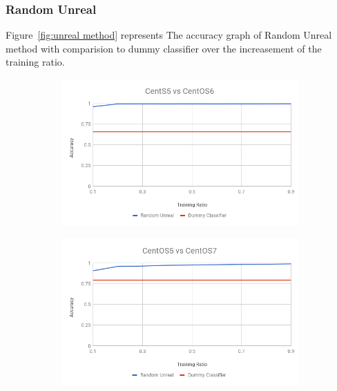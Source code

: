 \documentclass[10pt, conference, compsocconf]{IEEEtran}
\begin{document}
\subsubsection{Random Unreal}
Figure~\ref{fig:unreal method} represents
The accuracy graph of Random Unreal method with comparision to dummy
classifier over the increasement of the training ratio.
\begin{figure}[h!]
        \centering
        \begin{subfigure}[b]{0.8\linewidth}
                \includegraphics[width=\columnwidth]{figures/ALS/unreal-ALS-5vs6-PFS}
        \end{subfigure}
        \begin{subfigure}[b]{0.8\linewidth}
                \includegraphics[width=\columnwidth]{figures/ALS/unreal-ALS-5vs7-PFS}
        \end{subfigure}
        \begin{subfigure}[b]{0.8\linewidth}

\end{subfigure}
\end{figure}
\end{document}
